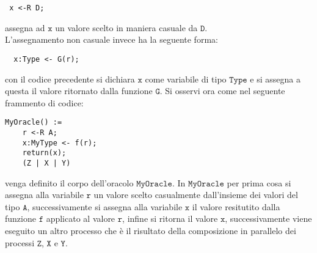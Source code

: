\documentclass[a4paper,openright,twoside,12pt]{report}
\begin{document}
\begin{verbatim}
 x <-R D;
\end{verbatim}
assegna ad $\texttt{x}$ un valore scelto in maniera casuale da $\texttt{D}$. \\
L'assegnamento non casuale invece ha la seguente forma:
\begin{verbatim}
  x:Type <- G(r);
 \end{verbatim}
con il codice precedente si dichiara $\texttt{x}$ come variabile di tipo $\texttt{Type}$ e si assegna a questa il valore ritornato dalla funzione $\texttt{G}$.
Si osservi ora come nel seguente frammento di codice:
\begin{verbatim}
MyOracle() :=
    r <-R A;
    x:MyType <- f(r);
    return(x);
    (Z | X | Y)
\end{verbatim}
venga definito il corpo dell'oracolo $\texttt{MyOracle}$. In $\texttt{MyOracle}$ per prima cosa si assegna alla variabile $\texttt{r}$ un valore scelto casualmente dall'insieme dei valori del tipo $\texttt{A}$,
successivamente si assegna alla variabile $\texttt{x}$ il valore resitutito dalla funzione $\texttt{f}$ applicato al valore $\texttt{r}$, infine si ritorna il valore $\texttt{x}$, successivamente viene eseguito un altro processo
che \`e il risultato della composizione in parallelo dei processi $\texttt{Z}$, $\texttt{X}$ e $\texttt{Y}$. 
\end{document}
